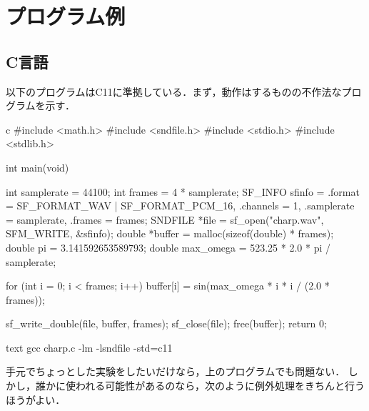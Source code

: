 \documentclass[../../main]{subfiles}
\begin{document}
\chapter{プログラム例}

\section{C言語}

以下のプログラムはC11に準拠している．まず，動作はするものの不作法なプログラムを示す．

\begin{codeblock}{c}
#include <math.h>
#include <sndfile.h>
#include <stdio.h>
#include <stdlib.h>

int main(void) {
  int samplerate = 44100;
  int frames = 4 * samplerate;
  SF_INFO sfinfo = {.format = SF_FORMAT_WAV | SF_FORMAT_PCM_16,
                    .channels = 1,
                    .samplerate = samplerate,
                    .frames = frames};
  SNDFILE *file = sf_open("charp.wav", SFM_WRITE, &sfinfo);
  double *buffer = malloc(sizeof(double) * frames);
  double pi = 3.141592653589793;
  double max_omega = 523.25 * 2.0 * pi / samplerate;

  for (int i = 0; i < frames; i++) {
    buffer[i] = sin(max_omega * i * i / (2.0 * frames));
  }

  sf_write_double(file, buffer, frames);
  sf_close(file);
  free(buffer);
  return 0;
}
\end{codeblock}

\begin{codeblock}{text}
gcc charp.c -lm -lsndfile -std=c11
\end{codeblock}

手元でちょっとした実験をしたいだけなら，上のプログラムでも問題ない．
しかし，誰かに使われる可能性があるのなら，次のように例外処理をきちんと行うほうがよい．
\end{document}
